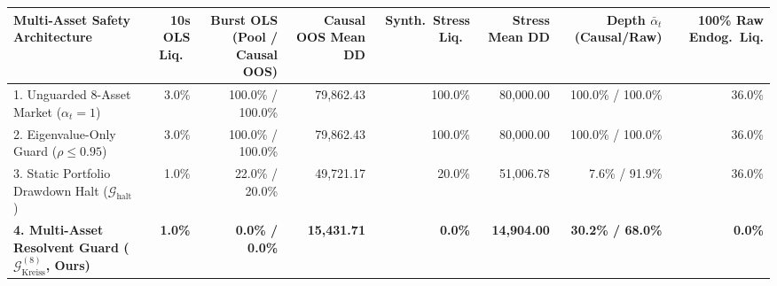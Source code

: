 \begin{table}[htbp]
{\begin{tabular}{lrrrrrrr}
\midrule
Multi-Asset Safety Architecture & 10s OLS Liq.\ & \textbf{Burst OLS (Pool / Causal OOS)} & \textbf{Causal OOS Mean DD} & Synth.\ Stress Liq.\ & Stress Mean DD & Depth $\bar{\alpha}_t$ (Causal/Raw) & \textbf{100\% Raw Endog.\ Liq.} \\
\midrule
1. Unguarded 8-Asset Market ($\alpha_t = 1$) & 3.0\% & 100.0\% / 100.0\% & 79,862.43 & 100.0\% & 80,000.00 & 100.0\% / 100.0\% & 36.0\% \\
2. Eigenvalue-Only Guard ($\rho \le 0.95$) & 3.0\% & 100.0\% / 100.0\% & 79,862.43 & 100.0\% & 80,000.00 & 100.0\% / 100.0\% & 36.0\% \\
3. Static Portfolio Drawdown Halt ($\mathcal{G}_{\mathrm{halt}}$) & 1.0\% & 22.0\% / 20.0\% & 49,721.17 & 20.0\% & 51,006.78 & 7.6\% / 91.9\% & 36.0\% \\
\textbf{4. Multi-Asset Resolvent Guard ($\mathcal{G}_{\mathrm{Kreiss}}^{(8)}$, Ours)} & \textbf{1.0\%} & \textbf{0.0\% / 0.0\%} & \textbf{15,431.71} & \textbf{0.0\%} & \textbf{14,904.00} & \textbf{30.2\% / 68.0\%} & \textbf{0.0\%} \\
\bottomrule
\end{tabular}%
}
\end{table}
